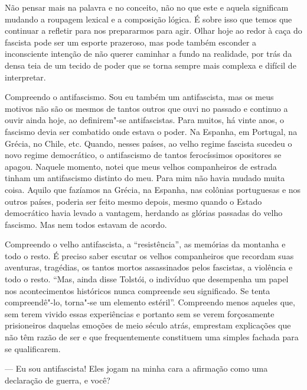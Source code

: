 Não pensar mais na palavra e no conceito, não no que este e aquela
significam mudando a roupagem lexical e a composição lógica. É sobre
isso que temos que continuar a refletir para nos prepararmos para agir.
Olhar hoje ao redor à caça do fascista pode ser um esporte prazeroso,
mas pode também esconder a inconsciente intenção de não querer caminhar
a fundo na realidade, por trás da densa teia de um tecido de poder que
se torna sempre mais complexa e difícil de interpretar.

Compreendo o antifascismo. Sou eu também um antifascista, mas os meus
motivos não são os mesmos de tantos outros que ouvi no passado e
continuo a ouvir ainda hoje, ao definirem"-se antifascistas. Para muitos,
há vinte anos, o fascismo devia ser combatido onde estava o poder. Na
Espanha, em Portugal, na Grécia, no Chile, etc. Quando, nesses países,
ao velho regime fascista sucedeu o novo regime democrático, o
antifascismo de tantos ferocíssimos opositores se apagou. Naquele
momento, notei que meus velhos companheiros de estrada tinham um
antifascismo distinto do meu. Para mim não havia mudado muita coisa.
Aquilo que fazíamos na Grécia, na Espanha, nas colônias portuguesas e
nos outros países, poderia ser feito mesmo depois, mesmo quando o Estado
democrático havia levado a vantagem, herdando as glórias passadas do
velho fascismo. Mas nem todos estavam de acordo.

Compreendo o velho antifascista, a ``resistência'', as memórias da
montanha e todo o resto. É preciso saber escutar os velhos companheiros
que recordam suas aventuras, tragédias, os tantos mortos assassinados
pelos fascistas, a violência e todo o resto. ``Mas, ainda disse Tolstói,
o indivíduo que desempenha um papel nos acontecimentos históricos nunca
compreende seu significado. Se tenta compreendê"-lo, torna"-se um elemento
estéril''. Compreendo menos aqueles que, sem terem vivido essas
experiências e portanto sem se verem forçosamente prisioneiros daquelas
emoções de meio século atrás, emprestam explicações que não têm razão de
ser e que frequentemente constituem uma simples fachada para se
qualificarem.

--- Eu sou antifascista! Eles jogam na minha cara a afirmação como uma
declaração de guerra, e você?

